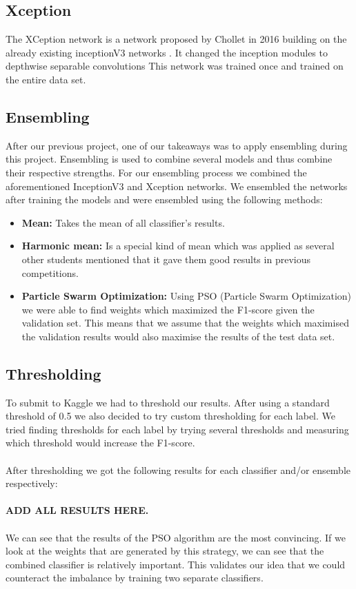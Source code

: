 \documentclass[10pt, a4paper]{article}
\begin{document}
\begin{multicols}{2}
		\subsection{Xception}
		The XCeption network is a network proposed by Chollet in 2016 building on the already existing inceptionV3 networks \cite{chollet2016xception}. 
		It changed the inception modules to depthwise separable convolutions 
		This network was trained once and trained on the entire data set.
		
		\subsection{Ensembling}
		After our previous project, one of our takeaways was to apply ensembling during this project. Ensembling is used to combine several models and thus combine their respective strengths. For our ensembling process we combined the aforementioned InceptionV3 and Xception networks. We ensembled the networks after training the models and were ensembled using the following methods:
		\begin{itemize}
		    \item \textbf{Mean:} Takes the mean of all classifier's results.
		    \item \textbf{Harmonic mean:} Is a special kind of mean which was applied as several other students mentioned that it gave them good results in previous competitions. 
		    \item \textbf{Particle Swarm Optimization:} Using PSO (Particle Swarm Optimization) we were able to find weights which maximized the F1-score given the validation set. This means that we assume that the weights which maximised the validation results would also maximise the results of the test data set. 
		\end{itemize}

		\subsection{Thresholding}
		To submit to Kaggle we had to threshold our results. After using a standard threshold of 0.5 we also decided to try custom thresholding for each label. We tried finding thresholds for each label by trying several thresholds and measuring which threshold would increase the F1-score.
		\\
		\\
		After thresholding we got the following results for each classifier and/or ensemble respectively:
		\\
		\\
		\textbf{ADD ALL RESULTS HERE.}
		\\
		\\
        We can see that the results of the PSO algorithm are the most convincing. If we look at the weights that are generated by this strategy, we can see that the combined classifier is relatively important. This validates our idea that we could counteract the imbalance by training two separate classifiers.


\end{multicols}
\end{document}

